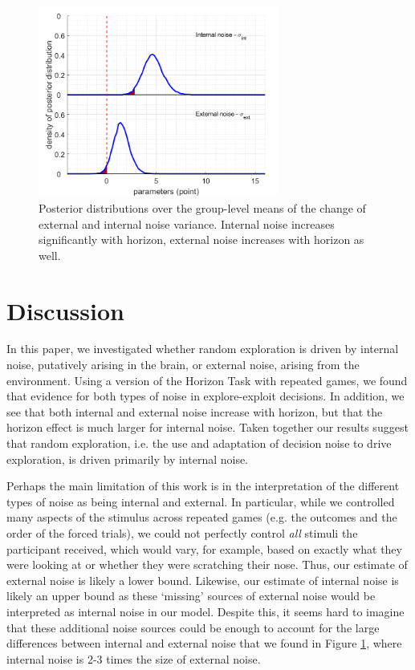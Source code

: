 \documentclass[12pt]{article}
\begin{document}
	
	\begin{figure}[H]
		\begin{center}
			\includegraphics[width=0.7\textwidth]{figures/dist_hypernoise.png}
			\caption[Posterior distributions over the group-level means of the change of external and internal noise variance.]{Posterior distributions over the group-level means of the change of external and internal noise variance. Internal noise increases significantly with horizon, external noise increases with horizon as well.}			
			\label{fig:mb2}
		\end{center}
	\end{figure}
	
	\section*{Discussion}
	In this paper, we investigated whether random exploration is driven by internal noise, putatively arising in the brain, or external noise, arising from the environment. Using a version of the Horizon Task with repeated games, we found that evidence for both types of noise in explore-exploit decisions. In addition, we see that both internal and external noise increase with horizon, but that the horizon effect is much larger for internal noise.  Taken together our results suggest that random exploration, i.e. the use and adaptation of decision noise to drive exploration, is driven primarily by internal noise.

	Perhaps the main limitation of this work is in the interpretation of the different types of noise as being internal and external. In particular, while we controlled many aspects of the stimulus across repeated games (e.g. the outcomes and the order of the forced trials), we could not perfectly control {\it all} stimuli the participant received, which would vary, for example, based on exactly what they were looking at or whether they were scratching their nose. Thus, our estimate of external noise is likely a lower bound. Likewise, our estimate of internal noise is likely an upper bound as these `missing' sources of external noise would be interpreted as internal noise in our model. Despite this, it seems hard to imagine that these additional noise sources could be enough to account for the large differences between internal and external noise that we found in Figure \ref{fig:mb2}, where internal noise is 2-3 times the size of external noise.  
	
\end{document}
